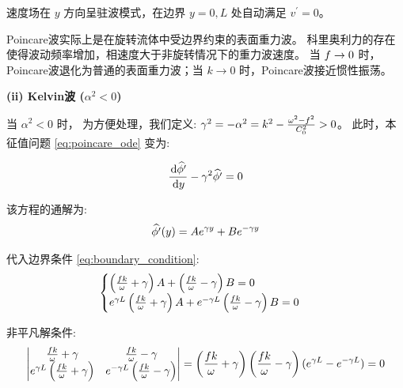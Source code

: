 速度场在 $y$ 方向呈驻波模式，在边界 $y = 0, L$ 处自动满足 $v^\prime = 0$。

\begin{insightbox}[Poincare波的物理图景]
    Poincare波实际上是在旋转流体中受边界约束的表面重力波。
    科里奥利力的存在使得波动频率增加，相速度大于非旋转情况下的重力波速度。
    当 $f \to 0$ 时，Poincare波退化为普通的表面重力波；当 $k \to 0$ 时，Poincare波接近惯性振荡。
\end{insightbox}

\textbf{(ii) Kelvin波 ($\alpha^2 < 0$)}

当 $\alpha^2 < 0$ 时，
为方便处理，我们定义: $\gamma^2 = -\alpha^2 = k^2 - \frac{\omega^2 - f^2}{C_0^2} > 0$。
此时，本征值问题 \eqref{eq:poincare_ode} 变为:

\begin{equation}
    \ode{\complexamp{\gravpotential^\prime}}{y} - \gamma^2 \complexamp{\gravpotential^\prime} = 0
    \label{eq:kelvin_ode}
\end{equation}

该方程的通解为:
\begin{equation}
    \widehat{\phi^\prime}(y) = A e^{\gamma y} + B e^{-\gamma y}
    \label{eq:kelvin_general_solution}
\end{equation}

代入边界条件 \eqref{eq:boundary_condition}:
\begin{equation*}
    \begin{cases}
        \left(\frac{f k}{\omega} + \gamma\right) A + \left(\frac{f k}{\omega} - \gamma\right) B = 0 \\
        e^{\gamma L}\left(\frac{f k}{\omega} + \gamma\right) A + e^{-\gamma L}\left(\frac{f k}{\omega} - \gamma\right) B = 0
    \end{cases}
\end{equation*}

非平凡解条件:
\begin{equation*}
    \begin{vmatrix}
        \frac{f k}{\omega} + \gamma & \frac{f k}{\omega} - \gamma \\
        e^{\gamma L}\left(\frac{f k}{\omega} + \gamma\right) & e^{-\gamma L}\left(\frac{f k}{\omega} - \gamma\right)
    \end{vmatrix}
    = \left(\frac{f k}{\omega} + \gamma\right) \left(\frac{f k}{\omega} - \gamma\right) (e^{\gamma L} - e^{-\gamma L}) = 0
\end{equation*}

